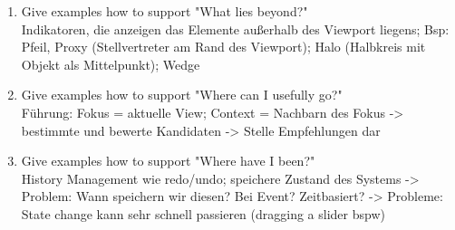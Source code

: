 \begin{enumerate}
	\item Give examples how to support "What lies beyond?"\\
	Indikatoren, die anzeigen das Elemente außerhalb des Viewport liegens; Bsp: Pfeil, Proxy (Stellvertreter am Rand des Viewport); Halo (Halbkreis mit Objekt als Mittelpunkt); Wedge	
	
	\item Give examples how to support "Where can I usefully go?"\\
	Führung: Fokus = aktuelle View; Context = Nachbarn des Fokus -> bestimmte und bewerte Kandidaten -> Stelle Empfehlungen dar
	
	\item Give examples how to support "Where have I been?"\\
	History Management wie redo/undo; speichere Zustand des Systems -> Problem: Wann speichern wir diesen? Bei Event? Zeitbasiert? -> Probleme: State change kann sehr schnell passieren (dragging a slider bspw) 
\end{enumerate}